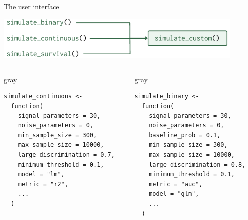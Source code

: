 \documentclass[11pt]{beamer}
\begin{document}
\begin{frame}[c,fragile]{The user interface}

	\vspace{1em}
	\centering
	\includegraphics[width=0.9\textwidth]{figures/interfaces.pdf}%
	\vspace{-1.5em}

	\begin{columns}
		\begin{column}[t]{0.55\textwidth}
			\begin{cbox}{gray}{}
				\begin{verbatim}
simulate_continuous <- 
  function(
    signal_parameters = 30,
    noise_parameters = 0,
    min_sample_size = 300,
    max_sample_size = 10000,
    large_discrimination = 0.7,
    minimum_threshold = 0.1,
    model = "lm",
    metric = "r2",
    ...
  ) 
            \end{verbatim}
			\end{cbox}
		\end{column}
		\begin{column}[t]{0.55\textwidth}
			\begin{cbox}{gray}{}
				\begin{verbatim}
simulate_binary <- 
  function(
    signal_parameters = 30,
    noise_parameters = 0,
    baseline_prob = 0.1,
    min_sample_size = 300,
    max_sample_size = 10000,
    large_discrimination = 0.8,
    minimum_threshold = 0.1,
    metric = "auc",
    model = "glm",
    ...
  )
            \end{verbatim}
			\end{cbox}
		\end{column}
	\end{columns}

\end{frame}
\end{document}
